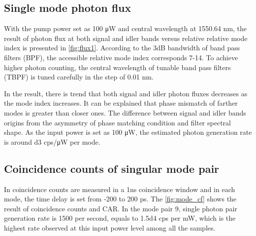 \begin{figure}
	\centering
	
	\label{fig:ligentec_gp1}
\end{figure}

\subsection{Single mode photon flux}

With the pump power set as 100 \si{\micro\watt} and central wavelength at 1550.64 nm, the result of photon flux at both signal and idler bands versus relative relative mode index is presented in \autoref{fig:flux1}. According to the 3dB bandwidth of band pass filters (BPF), the accessible relative mode index corresponds 7-14. To achieve higher photon counting, the central wavelength of tunable band pass filters (TBPF) is tuned carefully in the step of 0.01 nm.

In the result, there is trend that both signal and idler photon fluxes decreases as the mode index increases. It can be explained that phase mismatch of farther modes is greater than closer ones. The difference between signal and idler bands origins from the asymmetry of phase matching condition and filter spectral shape. As the input power is set as 100 \si{\micro\watt}, the estimated photon generation rate is around \num{d3} cps/\si{\micro\watt} per mode.

\begin{figure}
	\centering
	
	\label{fig:flux1}
\end{figure}


\subsection{Coincidence counts of singular mode pair}

In coincidence counts are measured in a 1ns coincidence window and in each mode, the time delay is set from -200 to 200 ps. The \autoref{fig:mode_cf} shows the result of coincidence counts and CAR. In the mode pair 9, single photon pair generation rate is 1500 per second, equals to \num{1.5d4} cps per mW, which is the highest rate observed at this input power level among all the samples.

